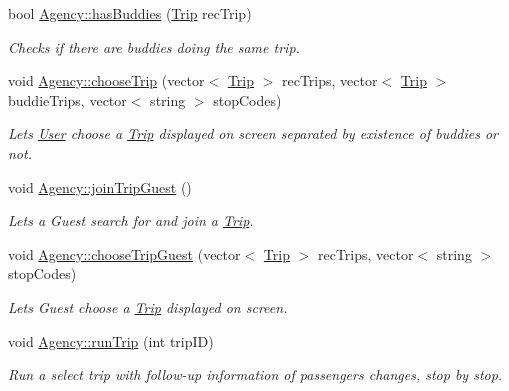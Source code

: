 \begin{DoxyCompactItemize}
bool \hyperlink{group___agency_gaa7fe817661a5e46322db9e809ac54fe9}{Agency\+::has\+Buddies} (\hyperlink{class_trip}{Trip} rec\+Trip)
\begin{DoxyCompactList}\small\item\em Checks if there are buddies doing the same trip. \end{DoxyCompactList}\item 
void \hyperlink{group___agency_gab93c48db5700b6d02bf81b3cd3af6711}{Agency\+::choose\+Trip} (vector$<$ \hyperlink{class_trip}{Trip} $>$ rec\+Trips, vector$<$ \hyperlink{class_trip}{Trip} $>$ buddie\+Trips, vector$<$ string $>$ stop\+Codes)
\begin{DoxyCompactList}\small\item\em Lets \hyperlink{class_user}{User} choose a \hyperlink{class_trip}{Trip} displayed on screen separated by existence of buddies or not. \end{DoxyCompactList}\item 
\mbox{\label{group___agency_ga5a21d06cf7fd4cae84b69554555f229e}} 
void \hyperlink{group___agency_ga5a21d06cf7fd4cae84b69554555f229e}{Agency\+::join\+Trip\+Guest} ()
\begin{DoxyCompactList}\small\item\em Lets a Guest search for and join a \hyperlink{class_trip}{Trip}. \end{DoxyCompactList}\item 
void \hyperlink{group___agency_ga7e9a9bafaab57a8e9a5963302b7401ff}{Agency\+::choose\+Trip\+Guest} (vector$<$ \hyperlink{class_trip}{Trip} $>$ rec\+Trips, vector$<$ string $>$ stop\+Codes)
\begin{DoxyCompactList}\small\item\em Lets Guest choose a \hyperlink{class_trip}{Trip} displayed on screen. \end{DoxyCompactList}\item 
void \hyperlink{group___agency_ga76d5990291e33a194a46c390986a668b}{Agency\+::run\+Trip} (int trip\+ID)
\begin{DoxyCompactList}\small\item\em Run a select trip with follow-\/up information of passengers changes, stop by stop. \end{DoxyCompactList}\end{DoxyCompactItemize}
